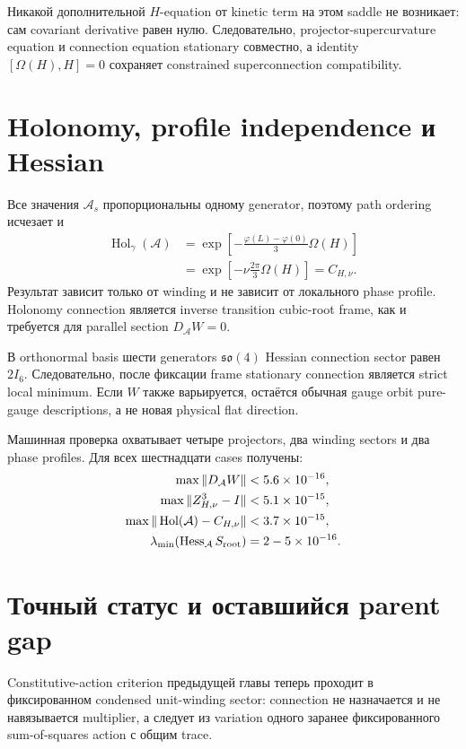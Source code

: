 Никакой дополнительной \(H\)-equation от kinetic term на этом saddle не
возникает: сам covariant derivative равен нулю. Следовательно,
projector-supercurvature equation и connection equation stationary
совместно, а identity \([\Omega(H),H]=0\) сохраняет constrained
superconnection compatibility.

\section{Holonomy, profile independence и Hessian}

Все значения \(\mathcal A_s\) пропорциональны одному generator, поэтому
path ordering исчезает и
\begin{align}
 \operatorname{Hol}_\gamma(\mathcal A)
 &=\exp\!\left[-\frac{\varphi(L)-\varphi(0)}{3}\Omega(H)\right]\\
 &=\exp\!\left[-\nu\frac{2\pi}{3}\Omega(H)\right]
 =C_{H,\nu}.
 \label{eq:root-action-holonomy}
\end{align}
Результат зависит только от winding и не зависит от локального phase
profile. Holonomy connection является inverse transition cubic-root frame,
как и требуется для parallel section \(D_{\mathcal A}W=0\).

В orthonormal basis шести generators \(\mathfrak{so}(4)\) Hessian
connection sector равен \(2I_6\). Следовательно, после фиксации frame
stationary connection является strict local minimum. Если \(W\) также
варьируется, остаётся обычная gauge orbit pure-gauge descriptions, а не
новая physical flat direction.

Машинная проверка охватывает четыре projectors, два winding sectors и два
phase profiles. Для всех шестнадцати cases получены:
\begin{align}
 \max\|D_{\mathcal A}W\|&<5.6\times10^{-16},\\
 \max\|Z_{H,\nu}^3-I\|&<5.1\times10^{-15},\\
 \max\|\operatorname{Hol}(\mathcal A)-C_{H,\nu}\|
 &<3.7\times10^{-15},\\
 \lambda_{\min}(\operatorname{Hess}_{\mathcal A}S_{\rm root})
 &=2-5\times10^{-16}.
\end{align}

\section{Точный статус и оставшийся parent gap}

Constitutive-action criterion предыдущей главы теперь проходит в
фиксированном condensed unit-winding sector: connection не назначается и
не навязывается multiplier, а следует из variation одного заранее
фиксированного sum-of-squares action с общим trace.

